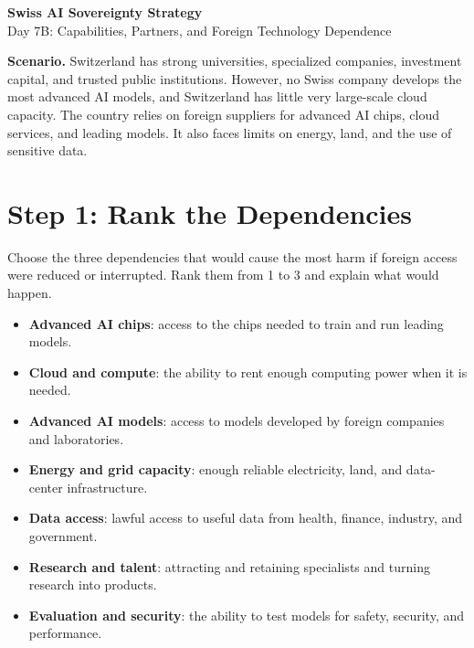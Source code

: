 \documentclass[11pt]{article}
\begin{document}
\begin{center}
{\LARGE\bfseries Swiss AI Sovereignty Strategy}\\[0.35em]
{\large Day 7B: Capabilities, Partners, and Foreign Technology Dependence}
\end{center}
\vspace{-0.5em}

\begin{tcolorbox}
\textbf{Scenario.} Switzerland has strong universities, specialized companies, investment capital, and trusted public institutions. However, no Swiss company develops the most advanced AI models, and Switzerland has little very large-scale cloud capacity. The country relies on foreign suppliers for advanced AI chips, cloud services, and leading models. It also faces limits on energy, land, and the use of sensitive data.
\end{tcolorbox}

\section*{Step 1: Rank the Dependencies}
Choose the three dependencies that would cause the most harm if foreign access were reduced or interrupted. Rank them from 1 to 3 and explain what would happen.

\begin{tcolorbox}[title=\textbf{Dependency menu},colback=white]
\begin{minipage}[t]{0.48\textwidth}
\begin{itemize}
  \item \textbf{Advanced AI chips}: access to the chips needed to train and run leading models.
  \item \textbf{Cloud and compute}: the ability to rent enough computing power when it is needed.
  \item \textbf{Advanced AI models}: access to models developed by foreign companies and laboratories.
  \item \textbf{Energy and grid capacity}: enough reliable electricity, land, and data-center infrastructure.
\end{itemize}
\end{minipage}\hfill
\begin{minipage}[t]{0.48\textwidth}
\begin{itemize}
  \item \textbf{Data access}: lawful access to useful data from health, finance, industry, and government.
  \item \textbf{Research and talent}: attracting and retaining specialists and turning research into products.
  \item \textbf{Evaluation and security}: the ability to test models for safety, security, and performance.
\end{itemize}
\end{minipage}
\end{tcolorbox}
\end{document}

